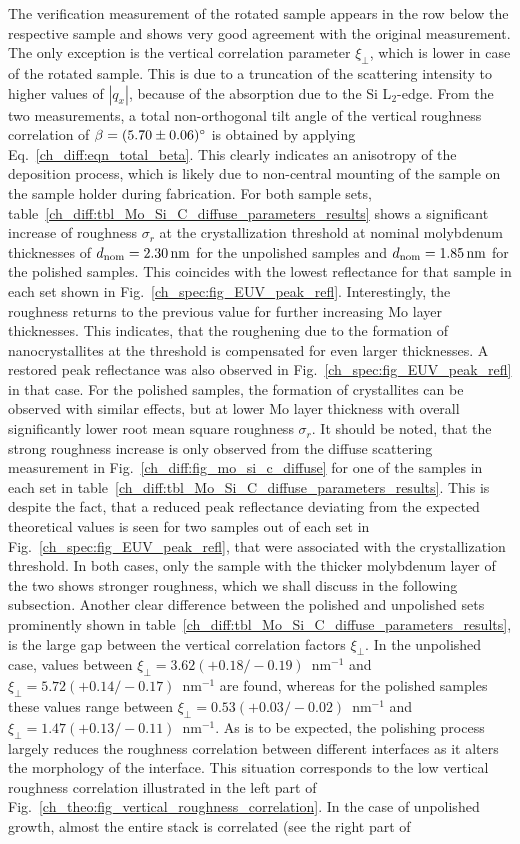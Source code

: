 The verification measurement of the rotated sample appears in the row below the respective sample and shows very good agreement with the original measurement. The only exception is the vertical correlation parameter $\xi_\perp$, which is lower in case of the rotated sample. This is due to a truncation of the scattering intensity to higher values of $|q_x|$, because of the absorption due to the Si L$_2$-edge. From the two measurements, a total non-orthogonal tilt angle of the vertical roughness correlation of $\beta = \SI{5.70\pm 0.06}{\degree}$ is obtained by applying Eq.~\eqref{ch_diff:eqn_total_beta}. This clearly indicates an anisotropy of the deposition process, which is likely due to non-central mounting of the sample on the sample holder during fabrication. For both sample sets, table~\ref{ch_diff:tbl_Mo_Si_C_diffuse_parameters_results} shows a significant increase of roughness $\sigma_r$ at the crystallization threshold at nominal molybdenum thicknesses of $d_\text{nom}=\nm{2.30}$ for the unpolished samples and $d_\text{nom}=\nm{1.85}$ for the polished samples. This coincides with the lowest reflectance for that sample in each set shown in Fig.~\ref{ch_spec:fig_EUV_peak_refl}. Interestingly, the roughness returns to the previous value for further increasing Mo layer thicknesses. This indicates, that the roughening due to the formation of nanocrystallites at the threshold is compensated for even larger thicknesses. A restored peak reflectance was also observed in Fig.~\ref{ch_spec:fig_EUV_peak_refl} in that case. For the polished samples, the formation of crystallites can be observed with similar effects, but at lower Mo layer thickness with overall significantly lower root mean square roughness $\sigma_r$. It should be noted, that the strong roughness increase is only observed from the diffuse scattering measurement in Fig.~\ref{ch_diff:fig_mo_si_c_diffuse} for one of the samples in each set in table~\ref{ch_diff:tbl_Mo_Si_C_diffuse_parameters_results}. This is despite the fact, that a reduced peak reflectance deviating from the expected theoretical values is seen for two samples out of each set in Fig.~\ref{ch_spec:fig_EUV_peak_refl}, that were associated with the crystallization threshold. In both cases, only the sample with the thicker molybdenum layer of the two shows stronger roughness, which we shall discuss in the following subsection. Another clear difference between the polished and unpolished sets prominently shown in table~\ref{ch_diff:tbl_Mo_Si_C_diffuse_parameters_results}, is the large gap between the vertical correlation factors $\xi_\perp$. In the unpolished case, values between $\xi_\perp=3.62(+ 0.18/- 0.19)$~nm$^{-1}$ and $\xi_\perp=5.72(+ 0.14/- 0.17)$~nm$^{-1}$ are found, whereas for the polished samples these values range between $\xi_\perp=0.53(+ 0.03/- 0.02)$~nm$^{-1}$ and $\xi_\perp=1.47(+ 0.13/- 0.11)$~nm$^{-1}$. As is to be expected, the polishing process largely reduces the roughness correlation between different interfaces as it alters the morphology of the interface. This situation corresponds to the low vertical roughness correlation illustrated in the left part of Fig.~\ref{ch_theo:fig_vertical_roughness_correlation}. In the case of unpolished growth, almost the entire stack is correlated (see the right part of 